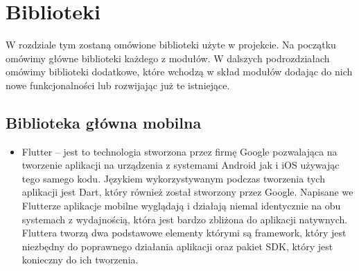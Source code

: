 \documentclass[a4paper,twoside,12pt]{book}
\begin{document}
\section{Biblioteki}
W rozdziale tym zostaną omówione biblioteki użyte w projekcie. Na początku omówimy główne biblioteki każdego z modułów. W dalszych podrozdziałach omówimy biblioteki dodatkowe, które wchodzą w skład modułów dodając do nich nowe funkcjonalności lub rozwijając już te istniejące.
\subsection{Biblioteka główna mobilna}
\begin{itemize}
    \item Flutter -- jest to technologia stworzona przez firmę Google pozwalająca na tworzenie aplikacji na urządzenia z systemami Android jak i iOS używając tego samego kodu. Językiem wykorzystywanym podczas tworzenia tych aplikacji jest Dart, który również został stworzony przez Google. Napisane we Flutterze aplikacje mobilne wyglądają i działają niemal identycznie na obu systemach z wydajnością, która jest bardzo zbliżona do aplikacji natywnych. Fluttera tworzą dwa podstawowe elementy którymi są framework, który jest niezbędny do poprawnego działania aplikacji oraz pakiet SDK, który jest konieczny do ich tworzenia.
\end{itemize}
\end{document}
